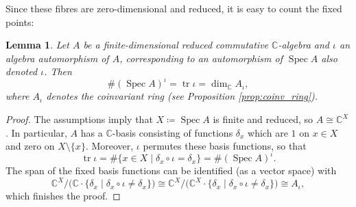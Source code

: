 \documentclass{amsart}
\newcommand{\C}{\mathbb{C}}
\newcommand{\Spec}{\operatorname{Spec}}
\newcommand{\tr}{\operatorname{tr}}
\theoremstyle{definition}
\theoremstyle{plain}
\newtheorem{lem}[defn]{Lemma}
\theoremstyle{remark}
\begin{document}
Since these fibres are zero-dimensional and reduced, it is easy to count the fixed points:
\begin{lem}
\label{lem:fp_tr_coinv}
    Let $A$ be a finite-dimensional reduced commutative $\C$-algebra and $\iota$ an algebra automorphism of $A$, corresponding to an automorphism of $\Spec A$ also denoted $\iota$. Then
    $$
        \# (\Spec A)^\iota
        =
        \tr \iota
        =
        \dim_\C A_\iota,
    $$
    where $A_\iota$ denotes the coinvariant ring (see Proposition \ref{prop:coinv_ring}).
\end{lem}
\begin{proof}
    The assumptions imply that $X\coloneqq \Spec A$ is finite and reduced, so $A\cong \C^X$. In particular, $A$ has a $\C$-basis consisting of functions $\delta_x$ which are $1$ on $x\in X$ and zero on $X\setminus \{x\}$. Moreover, $\iota$ permutes these basis functions, so that
    $$
        \tr \iota
        =
        \# \{x\in X\mid \delta_x \circ \iota = \delta_x\}
        = \# (\Spec A)^\iota.
    $$
    The span of the fixed basis functions can be identified (as a vector space) with 
    $$
        \C^X/\big( \C\cdot\{\delta_x\mid  \delta_x \circ \iota \ne \delta_x \} \big)
        \cong
        \C^X/\big( \C^X\cdot\{\delta_x\mid  \delta_x \circ \iota \ne \delta_x \} \big)
        \cong
        A_\iota,
    $$
    which finishes the proof.
\end{proof}
\end{document}
